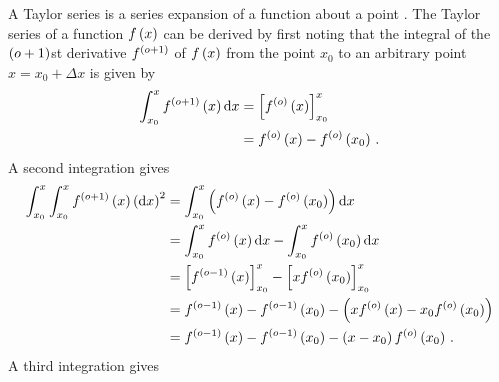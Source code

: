 A Taylor series is a series expansion of a function about a point \parencite{Weisstein2017}.
The Taylor series of a function $f\del{ x }$ can be derived by first noting that the integral of the $\del{ o+1 }$st derivative $f^{\del{ o+1 }}$ of $f\del{ x }$ from the point $x_0$ to an arbitrary point $x = x_0 + \Delta x$ is given by
\begin{align*}
  \int_{x_0}^x{f^{\del{ o+1 }}\del{ x }}\dif x &= \sbr{ f^{\del{ o }}\del{ x } }_{x_0}^x \\
                               &= f^{\del{ o }}\del{ x } - f^{\del{ o }}\del{ x_0 } \, .
\end{align*}
A second integration gives
\begin{align*}
  \int_{x_0}^x\int_{x_0}^x{f^{\del{ o+1 }}\del{ x }} \del{ \dif x }^2 &= \int_{x_0}^x{\del{ f^{\del{ o }}\del{ x } - f^{\del{ o }}\del{ x_0 } }}\dif x \\
                                    &= \int_{x_0}^x{f^{\del{ o }}\del{ x }}\dif x - \int_{x_0}^x{f^{\del{ o }}\del{ x_0 }}\dif x \\
                                    &= \sbr{ f^{\del{ o-1 }}\del{ x } }_{x_0}^x - \sbr{ x f^{\del{ o }}\del{ x_0 } }_{x_0}^x \\
                                    &= f^{\del{ o-1 }}\del{ x } - f^{\del{ o-1 }}\del{ x_0 } - \del{ x f^{\del{ o }}\del{ x } - x_0 f^{\del{ o }}\del{ x_0 } } \\
                                    &= f^{\del{ o-1 }}\del{ x } - f^{\del{ o-1 }}\del{ x_0 } - \del{ x - x_0 } f^{\del{ o }}\del{ x_0 } \, .
\end{align*}
A third integration gives

